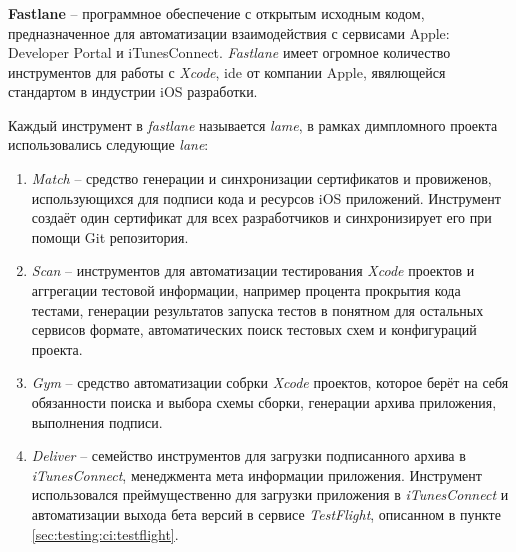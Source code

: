 \subsubsection{}
\label{sec:testing:ci:fastlane}

\textbf{Fastlane} -- программное обеспечение с открытым исходным кодом, предназначенное для автоматизации взаимодействия с сервисами Apple: Developer Portal и iTunesConnect. \textit{Fastlane} имеет огромное количество инструментов для работы с \textit{Xcode}, \gls{ide} от компании Apple, явялющейся стандартом в индустрии iOS разработки.

Каждый инструмент в \textit{fastlane} называется \textit{lame}, в рамках димпломного проекта использовались следующие \textit{lane}:

\begin{enumerate}
	\item \textit{Match} -- средство генерации и синхронизации сертификатов и провиженов, использующихся для подписи кода и ресурсов iOS приложений. Инструмент создаёт один сертификат для всех разработчиков и синхронизирует его при помощи Git репозитория.
	\item \textit{Scan} -- инструментов для автоматизации тестирования \textit{Xcode} проектов и аггрегации тестовой информации, например процента прокрытия кода тестами, генерации результатов запуска тестов в понятном для остальных сервисов формате, автоматических поиск тестовых схем и конфигураций проекта.
	\item \textit{Gym} -- средство автоматизации собрки \textit{Xcode} проектов, которое берёт на себя обязанности поиска и выбора схемы сборки, генерации архива приложения, выполнения подписи.
	\item \textit{Deliver} -- семейство инструментов для загрузки подписанного архива в \textit{iTunesConnect}, менеджмента мета информации приложения. Инструмент использовался преймущественно для загрузки приложения в \textit{iTunesConnect} и автоматизации выхода бета версий в сервисе \textit{TestFlight}, описанном в пункте \ref{sec:testing:ci:testflight}.
\end{enumerate}